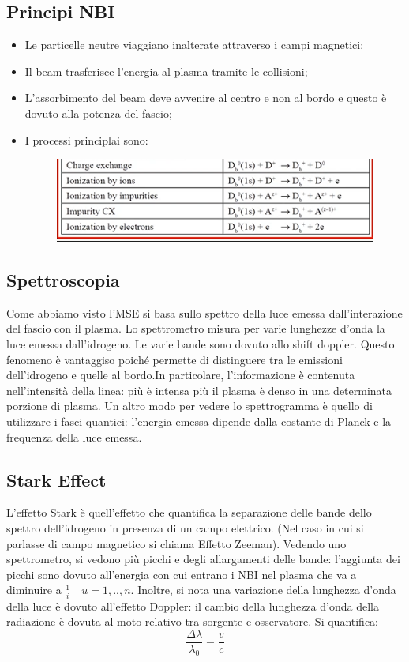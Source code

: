 \documentclass{article}
\begin{document}
\subsection{Principi NBI}
\begin{itemize}
	\item Le particelle neutre viaggiano inalterate attraverso i campi magnetici;
	\item Il beam trasferisce l'energia al plasma tramite le collisioni;
	\item L'assorbimento del beam deve avvenire al centro e non al bordo e questo è dovuto alla potenza del fascio;
	\item I processi principlai sono:\begin{figure}
		      \includegraphics[scale=0.4]{2022-05-26-23-49-28.png}%
	      \end{figure}
\end{itemize}
\subsection{Spettroscopia}
Come abbiamo visto l'MSE si basa sullo spettro della luce emessa dall'interazione del fascio con il plasma.\newline
Lo spettrometro misura per varie lunghezze d'onda la luce emessa dall'idrogeno. Le varie bande sono dovuto allo shift doppler. Questo fenomeno è vantaggiso poiché permette di distinguere tra le emissioni dell'idrogeno e quelle al bordo.\newline In particolare, l'informazione è contenuta nell'intensità della linea: più è intensa più il plasma è denso in una determinata porzione di plasma. Un altro modo per vedere lo spettrogramma è quello di utilizzare i fasci quantici: l'energia emessa dipende dalla costante di Planck e la frequenza della luce emessa.
\subsection{Stark Effect}
L'effetto Stark è quell'effetto che quantifica la separazione delle bande dello spettro dell'idrogeno in presenza di un campo elettrico. (Nel caso in cui si parlasse di campo magnetico si chiama Effetto Zeeman).\newline
Vedendo uno spettrometro, si vedono più picchi e degli allargamenti delle bande: l'aggiunta dei picchi sono dovuto all'energia con cui entrano i NBI nel plasma che va a diminuire a \(\frac{1}{i}\quad u=1,..,n\). Inoltre, si nota una variazione della lunghezza d'onda della luce è dovuto all'effetto Doppler: il cambio della lunghezza d'onda della radiazione è dovuta al moto relativo tra sorgente e osservatore. Si quantifica:
\begin{equation}
	\frac{\Delta\lambda}{\lambda_{0}}=\frac{v}{c}
\end{equation}
\end{document}
